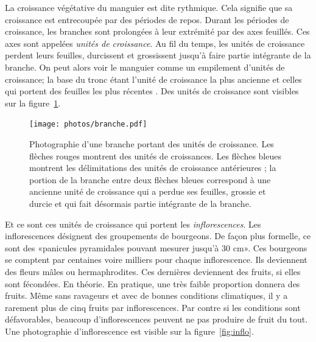 La croissance végétative du manguier est dite rythmique.
Cela signifie que sa croissance est entrecoupée par des périodes de repos.
Durant les périodes de croissance, les branches sont prolongées à leur extrémité par des axes feuillés.
Ces axes sont appelées \emph{unités de croissance}. 
Au fil du temps, les unités de croissance perdent leurs feuilles, durcissent et grossissent jusqu'à faire partie intégrante de la branche.
On peut alors voir le manguier comme un empilement d'unités de croissance;
la base du tronc étant l'unité de croissance la plus ancienne et celles qui portent des feuilles les plus récentes \citep{normand2009}.
Des unités de croissance sont visibles sur la figure~\ref{fig:uc}.
\begin{figure}[ht]
 \centering
 \texttt{[image: photos/branche.pdf]}
 \caption{Photographie d'une branche portant des unités de croissance. Les flèches rouges montrent des unités de croissances. Les flèches bleues montrent les délimitations des unités de croissance antérieures ; la portion de la branche entre deux flèches bleues correspond à une ancienne unité de croissance qui a perdue ses feuilles, grossie et durcie et qui fait désormais partie intégrante de la branche.}
 \label{fig:uc}
\end{figure}


\newpage

Et ce sont ces unités de croissance qui portent les \emph{inflorescences}.
Les inflorescences désignent des groupements de bourgeons. De façon plus formelle, ce sont des «panicules pyramidales pouvant mesurer jusqu’à 30 cm».
Ces bourgeons se comptent par centaines voire milliers pour chaque inflorescence. 
Ils deviennent des fleurs mâles ou hermaphrodites.
Ces dernières deviennent des fruits, si elles sont fécondées.
En théorie.
En pratique, une très faible proportion donnera des fruits.
Même sans ravageurs et avec de bonnes conditions climatiques, il y a rarement plus de cinq fruits par inflorescences.
Par contre si les conditions sont défavorables, beaucoup d'inflorescences peuvent ne pas produire de fruit du tout.
Une photographie d'inflorescence est visible sur la figure~\ref{fig:inflo}.

